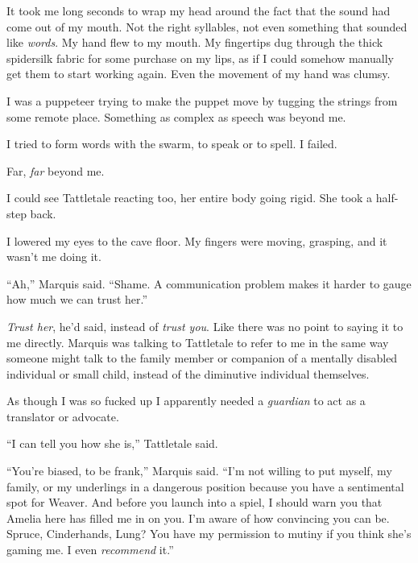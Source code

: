 It took me long seconds to wrap my head around the fact that the sound had come out of my mouth.  Not the right syllables, not even something that sounded like \emph{words}.  My hand flew to my mouth.  My fingertips dug through the thick spidersilk fabric for some purchase on my lips, as if I could somehow manually get them to start working again.  Even the movement of my hand was clumsy.



I was a puppeteer trying to make the puppet move by tugging the strings from some remote place.  Something as complex as speech was beyond me.



I tried to form words with the swarm, to speak or to spell.  I failed.



Far, \emph{far} beyond me.



I could see Tattletale reacting too, her entire body going rigid.  She took a half-step back.



I lowered my eyes to the cave floor.  My fingers were moving, grasping, and it wasn't me doing it.



``Ah,'' Marquis said.  ``Shame.  A communication problem makes it harder to gauge how much we can trust her.''



\emph{Trust her}, he'd said, instead of \emph{trust you}.  Like there was no point to saying it to me directly.  Marquis was talking to Tattletale to refer to me in the same way someone might talk to the family member or companion of a mentally disabled individual or small child, instead of the diminutive individual themselves.



As though I was so fucked up I apparently needed a \emph{guardian }to act as a translator or advocate.



``I can tell you how she is,'' Tattletale said.



``You're biased, to be frank,'' Marquis said.  ``I'm not willing to put myself, my family, or my underlings in a dangerous position because you have a sentimental spot for Weaver.  And before you launch into a spiel, I should warn you that Amelia here has filled me in on you.  I'm aware of how convincing you can be.  Spruce, Cinderhands, Lung?  You have my permission to mutiny if you think she's gaming me.  I even \emph{recommend} it.''




